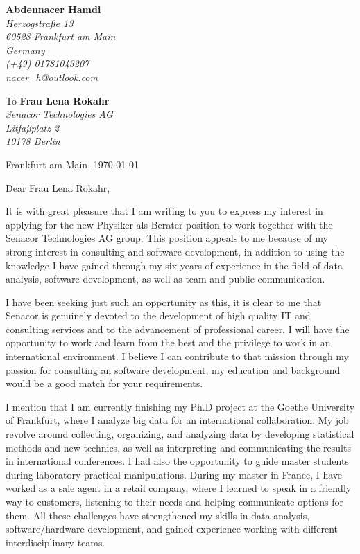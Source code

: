 \documentclass[11pt]{letter}
\begin{document}
 \sffamily
 \hfill
 \begin{flushleft}
 {\bfseries Abdennacer Hamdi}\\[.35ex]
 \small\itshape
 Herzogstra{\ss}e 13 \\
 60528 Frankfurt am Main \\
 Germany \\[.35ex]
 (+49) 01781043207 \\
 nacer\_h@outlook.com
 \end{flushleft}
 \begin{flushleft}
 To {\bfseries Frau Lena Rokahr}\\[.35ex]
 \small\itshape
 Senacor Technologies AG \\
 Litfaßplatz 2 \\
 10178 Berlin
 \end{flushleft}
 \hfill
 \begin{flushleft}
 Frankfurt am Main, \today \\
 
 \end{flushleft}
\par Dear Frau Lena Rokahr,
~\par It is with great pleasure that I am writing to you to express my interest in applying for the new Physiker als Berater position to work together with the Senacor Technologies AG group. This position appeals to me because of my strong interest in consulting and software development, in addition to using the knowledge I have gained through my six years of experience in the field of data analysis, software development, as well as team and public communication.
~\par I have been seeking just such an opportunity as this, it is clear to me that Senacor is genuinely devoted to the development of high quality IT and consulting services and to the advancement of professional career. I will have the opportunity to work and learn from the best and the privilege to work in an international environment. I believe I can contribute to that mission through my passion for consulting an software development, my education and background would be a good match for your requirements.
~\par I mention that I am currently finishing my Ph.D project at the Goethe University of Frankfurt, where I analyze big data for an international collaboration. My job revolve around collecting, organizing, and analyzing data by developing statistical methods and new technics, as well as interpreting and communicating the results in international conferences. I had also the opportunity to guide master students during laboratory practical manipulations. During my master in France, I have worked as a sale agent in a retail company, where I learned to speak in a friendly way to customers, listening to their needs and helping communicate options for them. All these challenges have strengthened my skills in data analysis, software/hardware development, and gained experience working with different interdisciplinary teams.
\end{document}
